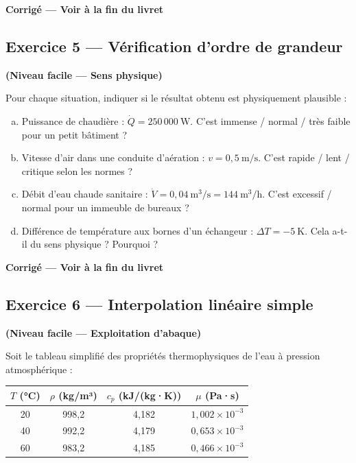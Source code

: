 \textbf{Corrigé — Voir à la fin du livret}

\subsection*{Exercice 5 — Vérification d'ordre de grandeur}

\textbf{(Niveau facile — Sens physique)}

Pour chaque situation, indiquer si le résultat obtenu est physiquement plausible :

\begin{enumerate}[a)]
  \item Puissance de chaudière : $\dot{Q} = 250\,000~\mathrm{W}$. C'est immense / normal / très faible pour un petit bâtiment ?

  \item Vitesse d'air dans une conduite d'aération : $v = 0{,}5~\mathrm{m/s}$. C'est rapide / lent / critique selon les normes ?

  \item Débit d'eau chaude sanitaire : $\dot{V} = 0{,}04~\mathrm{m^3/s} = 144~\mathrm{m^3/h}$. C'est excessif / normal pour un immeuble de bureaux ?

  \item Différence de température aux bornes d'un échangeur : $\Delta T = -5~\mathrm{K}$. Cela a-t-il du sens physique ? Pourquoi ?
\end{enumerate}

\textbf{Corrigé — Voir à la fin du livret}

\subsection*{Exercice 6 — Interpolation linéaire simple}

\textbf{(Niveau facile — Exploitation d'abaque)}

Soit le tableau simplifié des propriétés thermophysiques de l'eau à pression atmosphérique :

\begin{center}
  \sffamily\small
  \begin{tabular}{|c|c|c|c|}
    \hline
    \textbf{$T$ (°C)} & \textbf{$\rho$ (kg/m³)} & \textbf{$c_p$ (kJ/(kg·K))} & \textbf{$\mu$ (Pa·s)} \\
    \hline
    20 & 998{,}2 & 4{,}182 & $1{,}002 \times 10^{-3}$ \\
    40 & 992{,}2 & 4{,}179 & $0{,}653 \times 10^{-3}$ \\
    60 & 983{,}2 & 4{,}185 & $0{,}466 \times 10^{-3}$ \\
    \hline
  \end{tabular}
\end{center}

